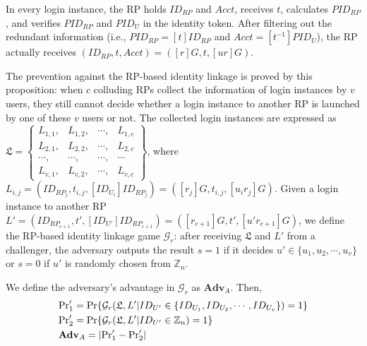 In every login instance,
    the RP holds $ID_{RP}$ and $Acct$, receives $t$, calculates $PID_{RP}$,
    and verifies $PID_{RP}$ and $PID_U$ in the identity token.
After filtering out the redundant information (i.e., $PID_{RP}= [t]{ID_{RP}}$ and $Acct = [t^{-1}]PID_{U}$),
    the RP actually receives $(ID_{RP}, t, Acct) = ([r]G, t, [ur]G)$.

The prevention against the RP-based identity linkage is proved
    by this proposition:
when $c$ colluding RPs collect the information of login instances by $v$ users,
    they still cannot decide whether a login instance to another RP is launched by one of these $v$ users or not.
The collected login instances are expressed as $\mathfrak{L}=\left\{ \begin{matrix}
L_{1,1}, & L_{1,2}, & \cdots, & L_{1,c}\\
L_{2,1}, & L_{2,2}, & \cdots, & L_{2,c}\\
\cdots, & \cdots, & \cdots, & \cdots\\
L_{v,1}, & L_{v,2}, & \cdots, & L_{v,c}
\end{matrix}\right\}$, where $L_{i, j} = (ID_{RP_j}, t_{i, j}, [ID_{U_i}]{ID_{RP_j}}) = ([r_j]G, t_{i,j}, [u_ir_j]G)$.
Given a login instance to another RP $L'=(ID_{RP_{c+1}}, t', [ID_{U'}]ID_{RP_{c+1}}) = ([r_{c+1}]G, t', [u'r_{c+1}]G)$,
we define the RP-based identity linkage game $\mathcal{G}_r$:
after receiving $\mathfrak{L}$ and $L'$ from a challenger,
    the adversary outputs the result $s = 1$ if it decides $u' \in \{u_1, u_2, \cdots, u_v\}$ or $s = 0$ if $u'$ is randomly chosen from $\mathbb{Z}_n$.


We define the adversary's advantage in $\mathcal{G}_r$ as $\mathbf{Adv}_{A}$.
Then,
\begin{align*}
&{\rm Pr}'_1={\rm Pr}\{\mathcal{G}_r(\mathfrak{L}, L'|ID_{U'} \in \{ID_{U_1}, ID_{U_2}, \cdots, ID_{U_v}\})=1\} \\
&{\rm Pr}'_2={\rm Pr}\{\mathcal{G}_r(\mathfrak{L}, L'|ID_{U'} \in \mathbb{Z}_n)=1\}\\
&{\mathbf{Adv}}_{A}=|{\rm Pr}'_1-{\rm Pr}'_2|
\end{align*}

